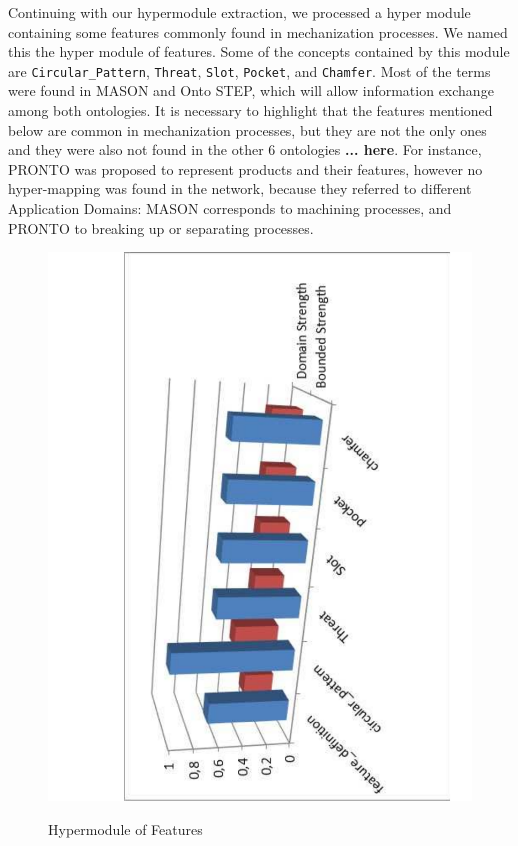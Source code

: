 Continuing with our hypermodule extraction, we processed a hyper module containing some features commonly found in mechanization processes. We named this the hyper module of features. Some of the concepts contained by this module are \texttt{Circular\_Pattern}, \texttt{Threat}, \texttt{Slot}, \texttt{Pocket}, and \texttt{Chamfer}. Most of the terms were found in MASON and Onto STEP, which will allow information exchange among both ontologies. It is necessary to highlight that the features mentioned below are common in mechanization processes, but they are not the only ones and they were also not found in the other 6 ontologies \textbf{... here}. For instance, PRONTO was proposed to represent products and their features, however no hyper-mapping was found in the network, because   they referred to different Application Domains: MASON corresponds to machining processes, and PRONTO to breaking up or separating processes.


\begin{figure}
\begin{center}
	\includegraphics[scale=0.5, angle=-90]{figure-chapterIV/fig4-22.pdf}\\
	\caption{Hypermodule of Features}
	\label{figure4-22}
\end{center}
\end{figure}

